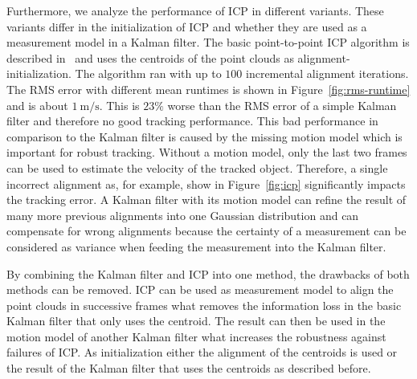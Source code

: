 \documentclass[twoside,a4paper,article]{combine}
\begin{document}
Furthermore, we analyze the performance of ICP in different
variants. These variants differ in the initialization of ICP and
whether they are used as a measurement model in a Kalman
filter. The basic point-to-point ICP algorithm is described
in~\cite{icp-basic} and uses the centroids of the point clouds as
alignment-initialization.
The algorithm ran with up to $100$ incremental
alignment iterations. The RMS error with different mean runtimes is
shown in Figure~\ref{fig:rms-runtime} and is about
$1\mathrm{~m/s}$. This is $23\%$ worse than the RMS error of a simple
Kalman filter and therefore no good tracking performance. This bad
performance in comparison to the Kalman filter is caused by the
missing motion model which is important for robust tracking. Without a
motion model, only the last two frames can be used to estimate the
velocity of the tracked object. Therefore, a single incorrect
alignment as, for example, show in Figure~\ref{fig:icp} significantly
impacts the tracking error. A Kalman filter with its motion model
can refine the result of many more previous alignments into one
Gaussian distribution and can compensate for wrong alignments because the
certainty of a measurement can be considered as variance when feeding
the measurement into the Kalman filter. 

By combining the Kalman filter and ICP into one method, the drawbacks
of both methods can be removed. ICP can be used as measurement model
to align the point clouds in successive frames what removes the
information loss in the basic Kalman filter that only uses the
centroid. The result can then be used in the motion model of another
Kalman filter what increases the robustness against failures of
ICP. As initialization either the alignment of the centroids is used
or the result of the Kalman filter that uses the centroids as
described before.
\end{document}
